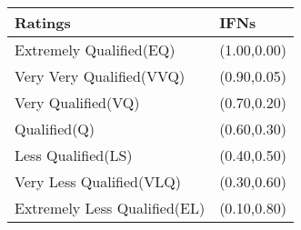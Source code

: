 \documentclass{article}\
\begin{document}
  \begin{tabular}{ p{6cm}|p{2.5cm}}
 \hline
 
    Ratings & IFNs \\
     \hline
   Extremely Qualified(EQ) & (1.00,0.00)\\
   Very Very Qualified(VVQ) & (0.90,0.05) \\
    Very Qualified(VQ) &  (0.70,0.20) \\
    Qualified(Q) & (0.60,0.30)\\
    Less Qualified(LS)  & (0.40,0.50)\\
   Very Less Qualified(VLQ)  &  (0.30,0.60)\\
    Extremely Less Qualified(EL)  & (0.10,0.80)  \\
    
    \hline
 \end{tabular}
 
\end{document}
